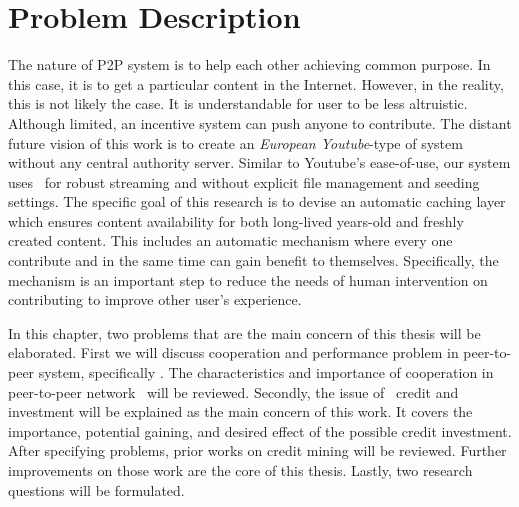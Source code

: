 \chapter{Problem Description}
\label{chp:relwork}
The nature of P2P system is to help each other achieving common purpose. In this case, it is to get a particular content in the Internet. However, in the reality, this is not likely the case. It is understandable for user to be less altruistic. Although limited, an incentive system can push anyone to contribute. The distant future vision of this work is to create an \textit{European Youtube}-type of system without any central authority server. Similar to Youtube's ease-of-use, our system uses \bt~for robust streaming and without explicit file management and seeding settings. The specific goal of this research is to devise an automatic caching layer which ensures content availability for both long-lived years-old and freshly created content. This includes an automatic mechanism where every one contribute and in the same time can gain benefit to themselves. Specifically, the mechanism is an important step to reduce the needs of human intervention on contributing to improve other user's experience.

In this chapter, two problems that are the main concern of this thesis will be elaborated. First we will discuss cooperation and performance problem in peer-to-peer system, specifically \bt. The characteristics and importance of cooperation in peer-to-peer network \bt~will be reviewed. Secondly, the issue of \bt~credit and investment will be explained as the main concern of this work. It covers the importance, potential gaining, and desired effect of the possible credit investment. After specifying problems, prior works on credit mining will be reviewed. Further improvements on those work are the core of this thesis. Lastly, two research questions will be formulated.

